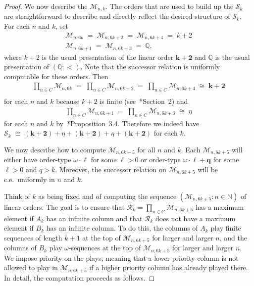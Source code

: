 \documentclass[11pt,a4paper,reqno]{amsart}
\theoremstyle{definition}
\newcommand{\iso}{\cong}
\newcommand{\Nb}{\mathbb{N}}
\newcommand{\Qb}{\mathbb{Q}}
\newcommand{\mc}[1]{\mathcal{#1}}
\begin{document}
\begin{proof}
We now describe the $\mc{M}_{n,k}$.
The orders that are used to build up the $\mc{S}_k$ are straightforward to describe and directly reflect the desired structure of $\mc{S}_k$.
For each $n$ and $k$, set
\begin{gather*}
\mc{M}_{n, 6k} \;=\; \mc{M}_{n, 6k+2} \;=\; \mc{M}_{n, 6k+4} \;=\; k+2\\
\mc{M}_{n, 6k+1}  \;=\; \mc{M}_{n, 6k+3} \;=\; \Qb,
\end{gather*}
where $k+2$ is the usual presentation of the linear order $\bm{k+2}$ and $\Qb$ is the usual presentation of $(\Qb; <)$.  Note that the successor relation is uniformly computable for these orders.  Then
\begin{align*}
\prod_{n \in C}\mc{M}_{n, 6k} \;=\; \prod_{n \in C}\mc{M}_{n, 6k+2} \;=\; \prod_{n \in C}\mc{M}_{n, 6k+4} \;\iso\; \bm{k+2}\\
\end{align*}
for each $n$ and $k$ because $k+2$ is finite (see~\cite{CohPowJournal}*{Section~2})  and
\begin{align*}
\prod_{n \in C}\mc{M}_{n, 6k+1}  \;=\; \prod_{n \in C}\mc{M}_{n, 6k+3} \;\iso\; \eta
\end{align*}
for each $n$ and $k$ by~\cite{CohPowJournal}*{Proposition~3.4}.  Therefore we indeed have $\mc{S}_k \;\iso\; (\bm{k+2}) + \eta + (\bm{k+2}) + \eta + (\bm{k+2})$ for each $k$.

We now describe how to compute $\mc{M}_{n, 6k+5}$ for all $n$ and $k$.  Each $\mc{M}_{n, 6k+5}$ will either have order-type $\omega\cdot\bm{\ell}$ for some $\ell > 0$ or order-type $\omega\cdot\bm{\ell} + \bm{q}$ for some $\ell > 0$ and $q > k$.  Moreover, the successor relation on $\mc{M}_{n, 6k+5}$ will be c.e.\ uniformly in $n$ and $k$.

Think of $k$ as being fixed and of computing the sequence $(\mc{M}_{n, 6k+5} : n \in \Nb)$ of linear orders.  The goal is to ensure that $\mc{R}_k = \prod_{n \in C} \mc{M}_{n, 6k+5}$ has a maximum element if $A_k$ has an infinite column and that $\mc{R}_k$ does not have a maximum element if $B_k$ has an infinite column.  To do this, the columns of $A_k$ play finite sequences of length $k+1$ at the top of $\mc{M}_{n, 6k+5}$ for larger and larger $n$, and the columns of $B_k$ play $\omega$-sequences at the top of $\mc{M}_{n, 6k+5}$ for larger and larger $n$.  We impose priority on the plays, meaning that a lower priority column is not allowed to play in $\mc{M}_{n, 6k+5}$ if a higher priority column has already played there.  In detail, the computation proceeds as follows.


\end{proof}
\end{document}
